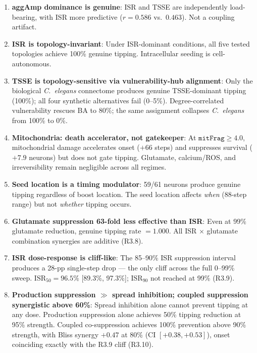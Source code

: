 \documentclass[12pt,a4paper]{article}
\begin{document}
\begin{enumerate}
\item \textbf{aggAmp dominance is genuine}: ISR and TSSE are independently load-bearing, with
      ISR more predictive ($r = 0.586$ vs.\ $0.463$). Not a coupling artifact.

\item \textbf{ISR is topology-invariant}: Under ISR-dominant conditions, all five tested
      topologies achieve 100\% genuine tipping. Intracellular seeding is cell-autonomous.

\item \textbf{TSSE is topology-sensitive via vulnerability-hub alignment}: Only the biological
      \textit{C.~elegans} connectome produces genuine TSSE-dominant tipping (100\%); all four
      synthetic alternatives fail (0--5\%). Degree-correlated vulnerability rescues BA to 80\%;
      the same assignment collapses \textit{C.~elegans} from 100\% to 0\%.

\item \textbf{Mitochondria: death accelerator, not gatekeeper}: At $\texttt{mitFrag} \geq 4.0$,
      mitochondrial damage accelerates onset ($+66$ steps) and suppresses survival ($+7.9$
      neurons) but does not gate tipping. Glutamate, calcium/ROS, and irreversibility remain
      negligible across all regimes.

\item \textbf{Seed location is a timing modulator}: 59/61 neurons produce genuine tipping
      regardless of boost location. The seed location affects \emph{when} (88-step range) but
      not \emph{whether} tipping occurs.

\item \textbf{Glutamate suppression 63-fold less effective than ISR}: Even at 99\% glutamate
      reduction, genuine tipping rate $= 1.000$. All ISR $\times$ glutamate combination
      synergies are additive (R3.8).

\item \textbf{ISR dose-response is cliff-like}: The 85--90\% ISR suppression interval produces
      a 28-pp single-step drop --- the only cliff across the full 0--99\% sweep.
      $\mathrm{ISR}_{50} = 96.5\%$ [89.3\%, 97.3\%]; $\mathrm{ISR}_{90}$ not reached at 99\%
      (R3.9).

\item \textbf{Production suppression $\gg$ spread inhibition; coupled suppression synergistic
      above 60\%}: Spread inhibition alone cannot prevent tipping at any dose. Production
      suppression alone achieves 50\% tipping reduction at 95\% strength. Coupled co-suppression
      achieves 100\% prevention above 90\% strength, with Bliss synergy $+0.47$ at 80\% (CI
      $[+0.38, +0.53]$), onset coinciding exactly with the R3.9 cliff (R3.10).
\end{enumerate}
\end{document}
